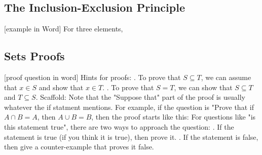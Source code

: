 \documentclass{article}
\begin{document}
\subsection{The Inclusion-Exclusion Principle}
[example in Word]
\newline
{}
\newline
\newline
For three elements, 
\newline
\newline
{}
\newline
{}
\newpage
\subsection{Sets Proofs}
[proof question in word]
\newline
Hints for proofs:
. To prove that $S \subseteq T$, we can assume that $x \in S$ and show that $x \in T$.
. 
To prove that $S = T$, we can show that $S \subseteq T$ and $T \subseteq S$.
\newline
\newline
Scaffold: 
\newline
{}
\newline
\newline
Note that the "Suppose that" part of the proof is usually whatever the if statment mentions.
\newline
\newline
For example, if the question is "Prove that if $A \cap B = A$, then $A \cup B = B$, then the proof starts like this:
\newline
{}
\newline
For questions like "is this statement true", there are two ways to approach the question:
. If the statement is true (if you think it is true), then prove it.
. If the statement is false, then give a counter-example that proves it false. 
\newpage
\end{document}
